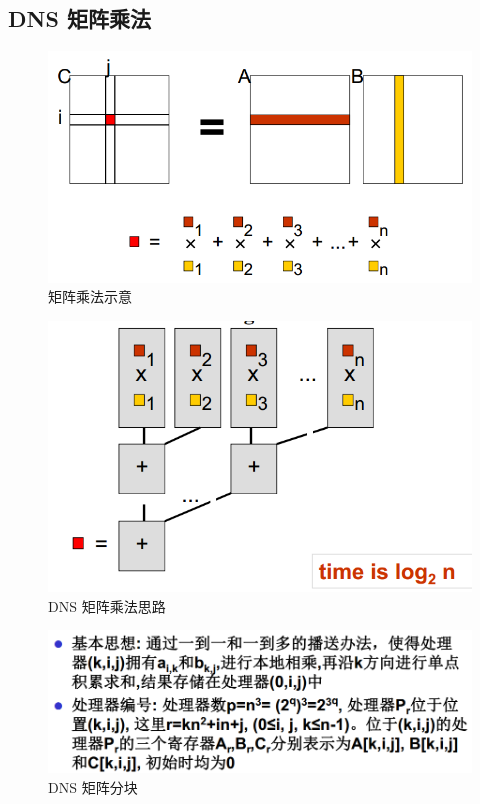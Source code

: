 \documentclass[UTF8,a4paper]{ctexart}
\begin{document}
\subsection{DNS 矩阵乘法}
\begin{figure}[H]
  \centering
  \includegraphics[scale = 0.3]{assets/ParallelComputing_a5e25.png}
  \caption{矩阵乘法示意}
\end{figure}

\begin{figure}[H]
  \centering
  \includegraphics[scale = 0.3]{assets/ParallelComputing_e8daa.png}
  \caption{DNS 矩阵乘法思路}
\end{figure}

\begin{figure}[H]
  \centering
  \includegraphics[scale = 0.3]{assets/ParallelComputing_86ce4.png}
  \caption{DNS 矩阵分块}
\end{figure}
\end{document}
